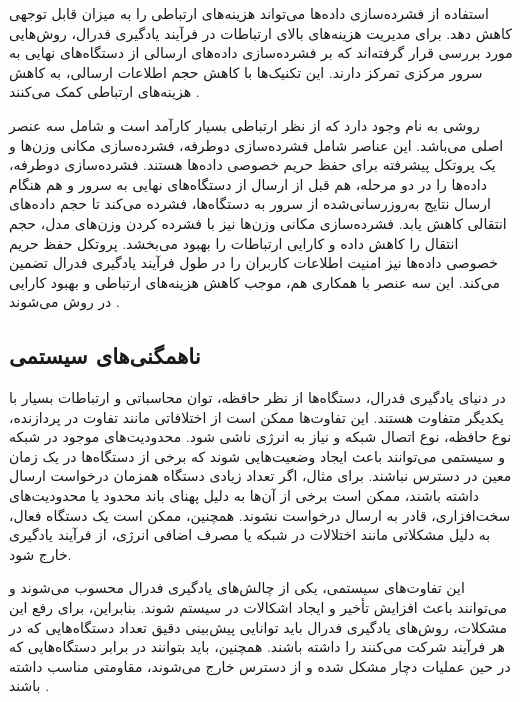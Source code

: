 استفاده از فشرده‌سازی داده‌ها می‌تواند هزینه‌های ارتباطی را به میزان قابل توجهی کاهش دهد. برای مدیریت هزینه‌های بالای ارتباطات در فرآیند یادگیری فدرال، روش‌هایی مورد بررسی قرار گرفته‌اند که بر فشرده‌سازی داده‌های ارسالی از دستگاه‌های نهایی به سرور مرکزی تمرکز دارند. این تکنیک‌ها با کاهش حجم اطلاعات ارسالی، به کاهش هزینه‌های ارتباطی کمک می‌کنند
\cite{konevcny2016federated}.

روشی به نام
%
وجود دارد که از نظر ارتباطی بسیار کارآمد است و شامل سه عنصر اصلی می‌باشد. این عناصر شامل فشرده‌سازی دوطرفه، فشرده‌سازی مکانی وزن‌ها و یک پروتکل پیشرفته برای حفظ حریم خصوصی داده‌ها هستند. فشرده‌سازی دوطرفه، داده‌ها را در دو مرحله، هم قبل از ارسال از دستگاه‌های نهایی به سرور و هم هنگام ارسال نتایج به‌روزرسانی‌شده از سرور به دستگاه‌ها، فشرده می‌کند تا حجم داده‌های انتقالی کاهش یابد. فشرده‌سازی مکانی وزن‌ها نیز با فشرده کردن وزن‌های مدل، حجم انتقال را کاهش داده و کارایی ارتباطات را بهبود می‌بخشد. پروتکل حفظ حریم خصوصی داده‌ها نیز امنیت اطلاعات کاربران را در طول فرآیند یادگیری فدرال تضمین می‌کند. این سه عنصر با همکاری هم، موجب کاهش هزینه‌های ارتباطی و بهبود کارایی در روش
می‌شوند
\cite{fang2021privacy}.



\subsection{
	ناهمگنی‌های سیستمی
}
در دنیای یادگیری فدرال، دستگاه‌ها از نظر حافظه، توان محاسباتی و ارتباطات بسیار با یکدیگر متفاوت هستند. این تفاوت‌ها ممکن است از اختلافاتی مانند تفاوت در پردازنده، نوع حافظه، نوع اتصال شبکه و نیاز به انرژی ناشی شود. محدودیت‌های موجود در شبکه و سیستمی می‌توانند باعث ایجاد وضعیت‌هایی شوند که برخی از دستگاه‌ها در یک زمان معین در دسترس نباشند. برای مثال، اگر تعداد زیادی دستگاه همزمان درخواست ارسال داشته باشند، ممکن است برخی از آن‌ها به دلیل پهنای باند محدود یا محدودیت‌های سخت‌افزاری، قادر به ارسال درخواست نشوند. همچنین، ممکن است یک دستگاه فعال، به دلیل مشکلاتی مانند اختلالات در شبکه یا مصرف اضافی انرژی، از فرآیند یادگیری خارج شود.

این تفاوت‌های سیستمی، یکی از چالش‌های یادگیری فدرال محسوب می‌شوند و می‌توانند باعث افزایش تأخیر و ایجاد اشکالات در سیستم شوند. بنابراین، برای رفع این مشکلات، روش‌های یادگیری فدرال باید توانایی پیش‌بینی دقیق تعداد دستگاه‌هایی که در هر فرآیند شرکت می‌کنند را داشته باشند. همچنین، باید بتوانند در برابر دستگاه‌هایی که در حین عملیات دچار مشکل شده و از دسترس خارج می‌شوند، مقاومتی مناسب داشته باشند
\cite{li2020federated}.


